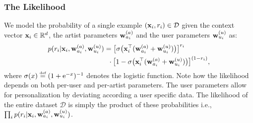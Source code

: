 \subsubsection{The Likelihood}
We model the probability of a single example $(\mathbf{x}_i, r_i) \in \mathcal{D}$ given the context vector $\mathbf{x}_i\in\mathbb{R}^d$,
the artist parameters $\mathbf{w}^{(a)}_{a_i}$ and the user parameters $\mathbf{w}^{(u)}_{u_i}$  as:
\begin{align}
 p( r_i | \mathbf{x}_i , \mathbf{w}^{(a)}_{a_i}, \mathbf{w}^{(u)}_{u_i} )
& =  \big[ \sigma \big( \mathbf{x}_i^\top ( \mathbf{w}^{(a)}_{a_i} + \mathbf{w}^{(u)}_{u_i} ) \big) \big]^{r_i} \nonumber \\ 
& \ \:  \cdot \big[ 1 - \sigma \big( \mathbf{x}_i^\top ( \mathbf{w}^{(a)}_{a_i} + \mathbf{w}^{(u)}_{u_i} ) \big) \big]^{(1-r_i)} ,
\label{eq:likelihood}
\end{align}
where  $\sigma(x) \defined (1 + \mathrm{e}^{-x})^{-1}$ denotes the logistic function. Note how the likelihood depends on both per-user and per-artist parameters. The user parameters allow for personalization by deviating according a user specific data. %
The likelihood of the entire dataset $\mathcal{D}$ is simply the product of these probabilities i.e., $\prod_i p( r_i | \mathbf{x}_i , \mathbf{w}^{(a)}_{a_i}, \mathbf{w}^{(u)}_{u_i})$.


